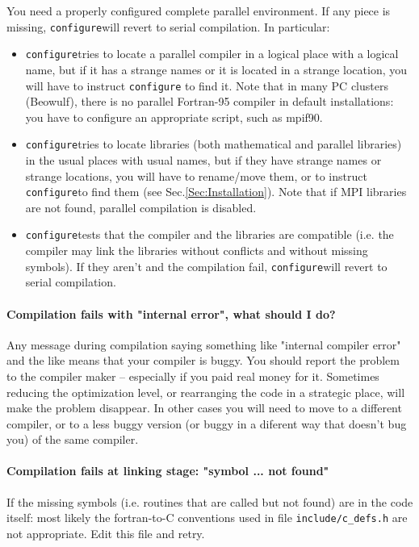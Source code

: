 \documentclass[12pt,a4paper]{article}
\def\configure{\texttt{configure}}
\begin{document}
You need a properly configured complete parallel environment. If any piece is
missing, \configure will revert to serial compilation. In particular: 
\begin{itemize}
\item \configure tries to locate a parallel compiler in a logical
  place with a logical name,  but if it has a strange names or it is
  located  in a strange location, you will have to instruct \configure
  to find it. Note that in many PC clusters (Beowulf), there is no
  parallel Fortran-95 compiler in default installations:  you have to
  configure an appropriate script, such as mpif90. 
\item \configure tries to locate libraries (both mathematical and
  parallel libraries) in the usual places with usual names, but if
  they have strange names or strange locations, you will have to
  rename/move them, or to instruct \configure to find them (see
   Sec.\ref{Sec:Installation}). Note that if MPI libraries are not found,
  parallel compilation is disabled. 
\item \configure tests that the compiler and the libraries are
  compatible (i.e. the compiler may link the libraries without
  conflicts and without missing symbols). If they aren't and the
  compilation fail, \configure will revert to serial compilation. 
\end{itemize}

\paragraph{Compilation fails with "internal error", what should I do?}

Any message during compilation saying something like "internal compiler error" 
and the like means that your compiler is buggy. You should report the problem 
to the compiler maker -- especially if you paid real money for it.
Sometimes reducing the optimization level, or rearranging the code in a
strategic place, will make the problem disappear. In other cases you 
will need to move to a different compiler, or to a less buggy version
(or buggy in a diferent way that doesn't bug you) of the same compiler.

\paragraph{Compilation fails at linking stage: "symbol ... not found"}
If the missing symbols (i.e. routines that are called but not found)
are in the code itself: most likely the fortran-to-C conventions used
in file \texttt{include/c\_defs.h} are not appropriate. Edit this file
and retry.
\end{document}
